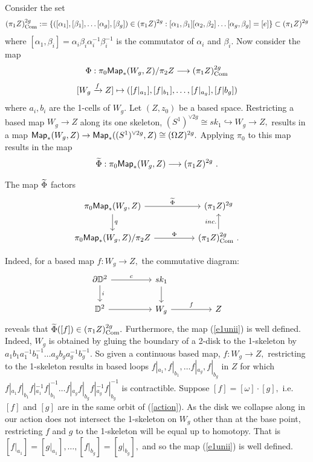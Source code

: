 Consider the set 
\[
(\pi_{1}Z)^{2g}_{\rm Com} := \{ ([\alpha_{1}], [\beta_{1}], \hdots [\alpha_{g}], [\beta_{g}]) \in (\pi_{1}Z)^{2g} : [\alpha_{1}, \beta_{1}][\alpha_{2}, \beta_{2}]\hdots[\alpha_{g}, \beta_{g}] = [e] \} \subset (\pi_{1}Z)^{2g}
\]
where $[\alpha_{1}, \beta_{i}] = \alpha_{i}\beta_{i}\alpha_{i}^{-1}\beta_{i}^{-1}$ is the commutator of $\alpha_{i}$ and $\beta_{i}$. Now consider the map
\begin{equation}\label{e1unii}
\Phi: \pi_{0}{\sf Map}_{\ast}(W_{g}, Z)/\pi_{2}Z \longrightarrow (\pi_{1}Z)^{2g}_{\rm Com}
\end{equation}
\[
[W_{g} \xrightarrow{f} Z] \mapsto ([f|_{a_{1}}], [f|_{b_{1}}], \hdots, [f|_{a_{g}}], [f|b_{g}])
\]
where $a_{i}, b_{i}$ are the 1-cells of $W_{g}.$ 
\newline \newline
Let $(Z, z_{0})$ be a based space. Restricting a based map $W_{g} \longrightarrow Z$ along its one skeleton, $(S^{1})^{\vee 2g} \cong sk_{1} \hookrightarrow W_{g} \longrightarrow Z,$ results in a map ${\sf Map}_{\ast}(W_{g}, Z) \rightarrow {\sf Map}_{\ast}((S^{1})^{\vee 2g}, Z) \cong (\Omega Z)^{2g}.$ Applying $\pi_{0}$ to this map results in the map 
\[
\widetilde{\Phi}: \pi_{0}{\sf Map}_{\ast}(W_{g}, Z) \longrightarrow (\pi_{1}Z)^{2g}~.
\]

\begin{observation}
The map $\widetilde{\Phi}$ factors
\[
\begin{tikzcd}
\pi_{0}{\sf Map}_{\ast}(W_{g}, Z) \arrow[d, "q"] \arrow[rr, "\w{\Phi}"] && (\pi_{1}Z)^{2g}     \\
\pi_{0}{\sf Map}_{\ast}(W_{g}, Z)/\pi_{2}Z \arrow[rr, "\Phi"] && \arrow[u, "inc."]   (\pi_{1}Z)^{2g}_{\rm Com}~.
\end{tikzcd}
\]

Indeed, for a based map $f: W_{g} \longrightarrow Z,$ the commutative diagram:
\[
\begin{tikzcd}
\partial \DD^{2 }\arrow[d, "i"] \arrow[rr, "c"] && sk_{1} \arrow[d, ""] &&  \\
\DD^{2} \arrow[rr, ""] &&   W_{g} \arrow[rr, "f"] && Z 
\end{tikzcd}
\]
reveals that $\widetilde{\Phi}([f]) \in  (\pi_{1}Z)^{2g}_{\rm Com}.$ 
Furthermore, the map (\ref{e1unii}) is well defined. Indeed, $W_{g}$ is obtained by gluing the boundary of a 2-disk to the 1-skeleton by $a_{1}b_{1}a_{1}^{-1}b_{1}^{-1}\hdots a_{g}b_{g}a_{g}^{-1}b_{g}^{-1}.$ So given a continuous based map, $f\colon W_{g} \rightarrow Z,$ restricting to the 1-skeleton results in based loops $f|_{a_{1}}, f|_{b_{1}}, \hdots f|_{a_{g}}, f|_{b_{g}}$ in $Z$ for which $f|_{a_{1}}f|_{b_{1}}f|_{a_{1}}^{-1}f|_{b_{1}}^{-1}\hdots f|_{a_{g}}f|_{b_{g}}f|_{a_{g}}^{-1}f|_{b_{g}}^{-1}$ is contractible. 
Suppose $[f] = [\omega] \cdot [g],$ i.e. $[f]$ and $[g]$ are in the same orbit of (\ref{action}). As the disk we collapse along in our action does not intersect the 1-skeleton on $W_{g}$ other than at the base point, restricting $f$ and $g$ to the 1-skeleton will be equal up to homotopy. That is $[f|_{a_{1}}] = [g|_{a_{1}}], \hdots, [f|_{b_{g}}] = [g|_{b_{g}}],$ and so the map (\ref{e1unii}) is well defined.


\end{observation}


